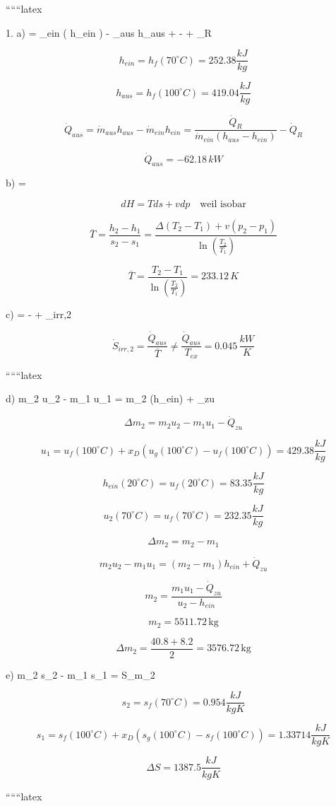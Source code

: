 
``````latex


1. a)  = _{ein} \left( h_{ein} \right) - _{aus} h_{aus} +  -  + _R

\[
h_{ein} = h_f \left( 70^\circ C \right) = 252.38 \frac{kJ}{kg}
\]

\[
h_{aus} = h_f \left( 100^\circ C \right) = 419.04 \frac{kJ}{kg}
\]

\[
\dot{Q}_{aus} = \dot{m}_{aus} h_{aus} - \dot{m}_{ein} h_{ein} = \frac{\dot{Q}_R}{\dot{m}_{ein} \left( h_{aus} - h_{ein} \right)} - \dot{Q}_R
\]

\[
\dot{Q}_{aus} = -62.18 \, kW
\]

b) \quad {} = 

\[
dH = T ds + v dp \quad \text{weil isobar}
\]

\[
\overline{T} = \frac{h_2 - h_1}{s_2 - s_1} = \frac{\Delta \left( T_2 - T_1 \right) + v \left( p_2 - p_1 \right)}{\ln \left( \frac{T_2}{T_1} \right)}
\]

\[
\overline{T} = \frac{T_2 - T_1}{\ln \left( \frac{T_2}{T_1} \right)} = 233.12 \, K
\]

c)  =  -  + _{irr,2}

\[
\dot{S}_{irr,2} = \frac{\dot{Q}_{aus}}{\overline{T}} \neq \frac{\dot{Q}_{aus}}{T_{ex}} = 0.045 \, \frac{kW}{K}
\]

``````latex

d) \quad m_2 u_2 - m_1 u_1 = \Delta m_2 (h_{ein}) + _{zu} \quad {}

\[
\Delta m_2 = m_2 u_2 - m_1 u_1 - \dot{Q}_{zu}
\]

\[
u_1 = u_f (100^\circ C) + x_D (u_g (100^\circ C) - u_f (100^\circ C)) = 429.38 \frac{kJ}{kg}
\]

\[
h_{ein} (20^\circ C) = u_f (20^\circ C) = 83.35 \frac{kJ}{kg}
\]

\[
u_2 (70^\circ C) = u_f (70^\circ C) = 232.35 \frac{kJ}{kg}
\]

\[
\Delta m_2 = m_2 - m_1
\]

\[
m_2 u_2 - m_1 u_1 = (m_2 - m_1) h_{ein} + \dot{Q}_{zu}
\]

\[
m_2 = \frac{m_1 u_1 - \dot{Q}_{zu}}{u_2 - h_{ein}}
\]

\[
m_2 = 5511.72 \, \text{kg}
\]

\[
\Delta m_2 = \frac{40.8 + 8.2}{2} = 3576.72 \, \text{kg}
\]

e) \quad m_2 s_2 - m_1 s_1 = \Delta S_{m_2}

\[
s_2 = s_f (70^\circ C) = 0.954 \frac{kJ}{kgK}
\]

\[
s_1 = s_f (100^\circ C) + x_D (s_g (100^\circ C) - s_f (100^\circ C)) = 1.33714 \frac{kJ}{kgK}
\]

\[
\Delta S = 1387.5 \frac{kJ}{kgK}
\]

``````latex


